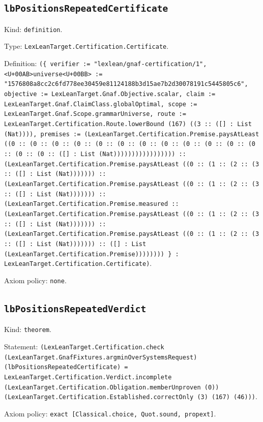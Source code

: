 \documentclass[11pt]{article}
\begin{document}
\subsection*{\texttt{lbPositionsRepeatedCertificate}}
\noindent Kind: \texttt{definition}.\par
\noindent Type: \texttt{LexLeanTarget.Certification.Certificate}.\par
\noindent Definition: \texttt{(\{ verifier := "lexlean/gnaf-certification/1", <U+00AB>universe<U+00BB> := "1576808a8cc2c6fd778ee30459e81124188b3d15ae7b2d30078191c5445805c6", objective := LexLeanTarget.Gnaf.Objective.scalar, claim := LexLeanTarget.Gnaf.ClaimClass.globalOptimal, scope := LexLeanTarget.Gnaf.Scope.grammarUniverse, route := LexLeanTarget.Certification.Route.lowerBound (167) ((3 :: ([] : List (Nat)))), premises := (LexLeanTarget.Certification.Premise.paysAtLeast ((0 :: (0 :: (0 :: (0 :: (0 :: (0 :: (0 :: (0 :: (0 :: (0 :: (0 :: (0 :: (0 :: (0 :: ([] : List (Nat))))))))))))))))) :: (LexLeanTarget.Certification.Premise.paysAtLeast ((0 :: (1 :: (2 :: (3 :: ([] : List (Nat))))))) :: (LexLeanTarget.Certification.Premise.paysAtLeast ((0 :: (1 :: (2 :: (3 :: ([] : List (Nat))))))) :: (LexLeanTarget.Certification.Premise.measured :: (LexLeanTarget.Certification.Premise.paysAtLeast ((0 :: (1 :: (2 :: (3 :: ([] : List (Nat))))))) :: (LexLeanTarget.Certification.Premise.paysAtLeast ((0 :: (1 :: (2 :: (3 :: ([] : List (Nat))))))) :: ([] : List (LexLeanTarget.Certification.Premise)))))))) \} : LexLeanTarget.Certification.Certificate)}.\par
\noindent Axiom policy: \texttt{none}.\par
\subsection*{\texttt{lbPositionsRepeatedVerdict}}
\noindent Kind: \texttt{theorem}.\par
\noindent Statement: \texttt{(LexLeanTarget.Certification.check (LexLeanTarget.GnafFixtures.argminOverSystemsRequest) (lbPositionsRepeatedCertificate) = LexLeanTarget.Certification.Verdict.incomplete (LexLeanTarget.Certification.Obligation.memberUnproven (0)) (LexLeanTarget.Certification.Established.correctOnly (3) (167) (46)))}.\par
\noindent Axiom policy: \texttt{exact [Classical.choice, Quot.sound, propext]}.\par
\end{document}
